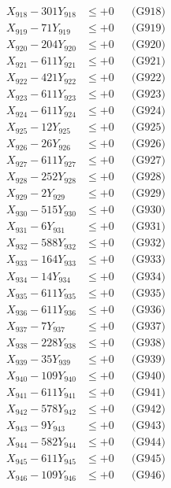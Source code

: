 \documentclass[a4paper,10pt]{article}
\begin{document}
{\begin{align}
X_{918} - 301Y_{918} &\leq +0 && \text{(G918)} \\
X_{919} - 71Y_{919} &\leq +0 && \text{(G919)} \\
X_{920} - 204Y_{920} &\leq +0 && \text{(G920)} \\
\allowbreak
X_{921} - 611Y_{921} &\leq +0 && \text{(G921)} \\
X_{922} - 421Y_{922} &\leq +0 && \text{(G922)} \\
X_{923} - 611Y_{923} &\leq +0 && \text{(G923)} \\
X_{924} - 611Y_{924} &\leq +0 && \text{(G924)} \\
X_{925} - 12Y_{925} &\leq +0 && \text{(G925)} \\
X_{926} - 26Y_{926} &\leq +0 && \text{(G926)} \\
X_{927} - 611Y_{927} &\leq +0 && \text{(G927)} \\
X_{928} - 252Y_{928} &\leq +0 && \text{(G928)} \\
X_{929} - 2Y_{929} &\leq +0 && \text{(G929)} \\
X_{930} - 515Y_{930} &\leq +0 && \text{(G930)} \\
\allowbreak
X_{931} - 6Y_{931} &\leq +0 && \text{(G931)} \\
X_{932} - 588Y_{932} &\leq +0 && \text{(G932)} \\
X_{933} - 164Y_{933} &\leq +0 && \text{(G933)} \\
X_{934} - 14Y_{934} &\leq +0 && \text{(G934)} \\
X_{935} - 611Y_{935} &\leq +0 && \text{(G935)} \\
X_{936} - 611Y_{936} &\leq +0 && \text{(G936)} \\
X_{937} - 7Y_{937} &\leq +0 && \text{(G937)} \\
X_{938} - 228Y_{938} &\leq +0 && \text{(G938)} \\
X_{939} - 35Y_{939} &\leq +0 && \text{(G939)} \\
X_{940} - 109Y_{940} &\leq +0 && \text{(G940)} \\
\allowbreak
X_{941} - 611Y_{941} &\leq +0 && \text{(G941)} \\
X_{942} - 578Y_{942} &\leq +0 && \text{(G942)} \\
X_{943} - 9Y_{943} &\leq +0 && \text{(G943)} \\
X_{944} - 582Y_{944} &\leq +0 && \text{(G944)} \\
X_{945} - 611Y_{945} &\leq +0 && \text{(G945)} \\
X_{946} - 109Y_{946} &\leq +0 && \text{(G946)} \\

\end{align}}
\end{document}
